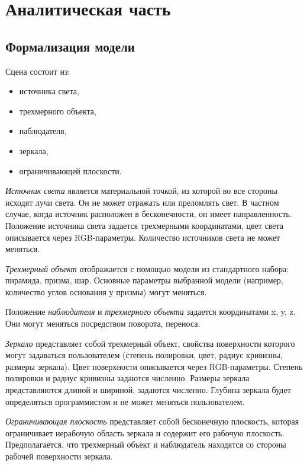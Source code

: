 \chapter{Аналитическая часть}

\section{Формализация модели}

Сцена состоит из:

\begin{itemize}
    \item источника света,
    \item трехмерного объекта,
    \item наблюдателя,
    \item зеркала,
    \item ограничивающей плоскости.
\end{itemize}

\emph{Источник света} является материальной точкой, из которой во все стороны исходят лучи света.
Он не может отражать или преломлять свет.
В частном случае, когда источник расположен в бесконечности, он имеет направленность.
Положение источника света задается трехмерными координатами, цвет света описывается через RGB-параметры.
Количество источников света не может меняться.

\emph{Трехмерный объект} отображается с помощью модели из стандартного набора: пирамида, призма, шар.
Основные параметры выбранной модели (например, количество углов основания у призмы) могут меняться.

Положение \emph{наблюдателя} и \emph{трехмерного объекта} задается координатами x, y, z. 
Они могут меняться посредством поворота, переноса.

\emph{Зеркало} представляет собой трехмерный объект, свойства поверхности которого могут задаваться пользователем (степень полировки, цвет, радиус кривизны, размеры зеркала).
Цвет поверхности описывается через RGB-параметры.
Степень полировки и радиус кривизны задаются численно.
Размеры зеркала представляются длиной и шириной, задаются численно. 
Глубина зеркала будет определяться программистом и не может меняться пользователем.

\emph{Ограничивающая плоскость} представляет собой бесконечную плоскость, которая ограничивает нерабочую область зеркала и содержит его рабочую плоскость.
Предполагается, что трехмерный объект и наблюдатель находятся со стороны рабочей поверхности зеркала.

